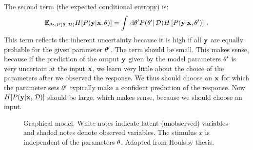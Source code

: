 The second term (the expected conditional entropy) is:
\begin{align}
	\mathbb{E}_{\theta \sim {P(\theta| \,\mathcal{D})}} H[{P({\bf y} | {\bf x}, \theta)}]
	= \int \,\mathrm{d} \theta' {P(\theta'|\,\mathcal{D})} H\left[{P({\bf y} | {\bf x}, \theta')}\right] \,.
\end{align} 
This term reflects the inherent uncertainty because it is high if all ${\bf y}$ are equally probable for the given parameter $\theta'$. The term should be small. This makes sense, because if the prediction of the output ${\bf y}$ given by the model parameters $\theta'$ is very uncertain at the input ${\bf x}$, we learn very little about the choice of the parameters after we observed the response. We thus should choose an ${\bf x}$ for which the parameter sets $\theta'$ typically make a confident prediction of the response.
Now $H[{P({\bf y} | {\bf x}, \,\mathcal{D})}]$ should be large, which makes sense, because we should choose an input.


\begin{figure}
\centering
  \caption{Graphical model. White notes indicate latent (unobserved) variables and shaded notes denote observed variables. The stimulus $x$ is independent of the parameters $\theta$. Adapted from Houlsby thesis.}
\end{figure}
